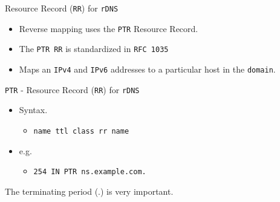 \documentclass[xcolor=table,aspectratio=169]{beamer}
\begin{document}
\begin{frame}{Resource Record (\texttt{RR}) for \texttt{rDNS}}
  \begin{itemize}
    \item Reverse mapping uses the \texttt{PTR} Resource Record.
    \item The \texttt{PTR RR} is standardized in \texttt{RFC 1035}
    \item Maps an \texttt{IPv4} and \texttt{IPv6} addresses to a particular host in the \texttt{domain}.
  \end{itemize}
\end{frame}

\begin{frame}{\texttt{PTR} - Resource Record (\texttt{RR}) for \texttt{rDNS}}
  \begin{itemize}
    \item Syntax.
      \begin{itemize}
        \item \texttt{name ttl class rr name}
      \end{itemize}
    \item e.g.
      \begin{itemize}
        \item \texttt{254     IN PTR ns.example.com.}
      \end{itemize}
  \end{itemize}
  \begin{tcolorbox}[title={\textbf{NOTE:}}]
    \begin{center}
      \scriptsize The terminating period (.) is very important.
    \end{center}
  \end{tcolorbox}
\end{frame}
\end{document}
